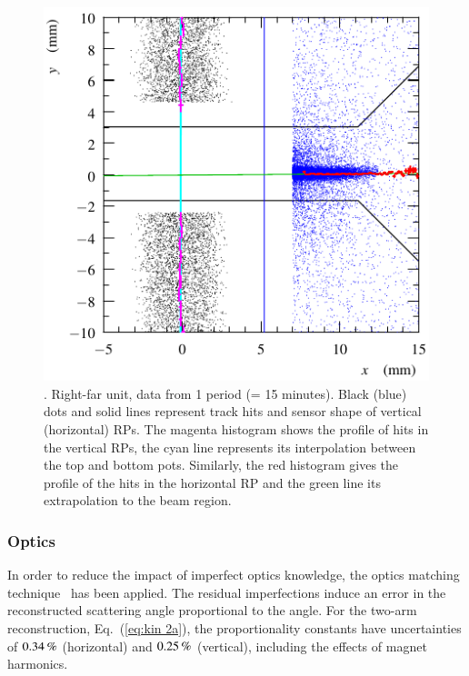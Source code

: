 
\begin{figure}
\begin{center}
\includegraphics{fig/alignment_method.pdf}
\caption{%
. Right-far unit, data from 1 period (= 15 minutes). Black (blue) dots and solid lines represent track hits and sensor shape of vertical (horizontal) RPs. The magenta histogram shows the profile of hits in the vertical RPs, the cyan line represents its interpolation between the top and bottom pots. Similarly, the red histogram gives the profile of the hits in the horizontal RP and the green line its extrapolation to the beam region.
}
\label{fig:align meth}
\end{center}
\end{figure}


\subsubsection{Optics}
\label{sec:optics}
%
In order to reduce the impact of imperfect optics knowledge, the optics matching technique~\cite{totem-optics} has been applied. The residual imperfections induce an error in the reconstructed scattering angle proportional to the angle. For the two-arm reconstruction, Eq.~(\ref{eq:kin 2a}), the proportionality constants have uncertainties of $0.34\,{\rm \%}$ (horizontal) and $0.25\,{\rm \%}$ (vertical), including the effects of magnet harmonics.

